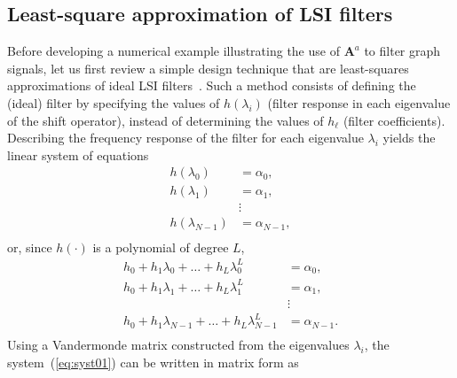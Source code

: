 \subsection{Least-square approximation of LSI filters}\label{subsec:lsi}
Before developing a numerical example illustrating the use of $\mathbf{A}^a$ to filter graph signals, let us first review a simple design technique that are least-squares approximations of ideal LSI filters~\cite{sandryhaila2014frequency}. Such a method consists of defining the (ideal) filter by specifying the values of $h(\lambda_i)$ (filter response in each eigenvalue of the shift operator), instead of determining the values of $h_{\ell}$ (filter coefficients). Describing the frequency response of the filter for each eigenvalue  $ \lambda_i $ yields the linear system of equations
\begin{equation}
    \label{eq:siseq}
    \begin{aligned}
        h(\lambda_0)     & = \alpha_0,     \\
        h(\lambda_1)     & = \alpha_1,     \\
                         & \vdots          \\
        h(\lambda_{N-1}) & = \alpha_{N-1}, \\
    \end{aligned}
\end{equation}
or, since $ h(\cdot) $ is a polynomial of degree $ L $,
\begin{equation}\label{eq:syst01}
    \begin{aligned}
        h_0 + h_1 \lambda_0 + \dots + h_L \lambda^L_0         & = \alpha_0,     \\
        h_0 + h_1 \lambda_1 + \dots  + h_L \lambda^L_1        & = \alpha_1,     \\
                                                              & \vdots          \\
        h_0 + h_1 \lambda_{N-1} + \dots + h_L \lambda^L_{N-1} & = \alpha_{N-1}. \\
    \end{aligned}
\end{equation}
Using a Vandermonde matrix constructed from the eigenvalues $\lambda_i$, the system~(\ref{eq:syst01}) can be written in matrix form as
